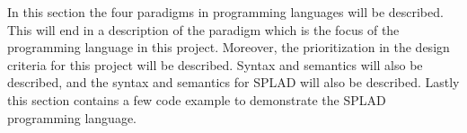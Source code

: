 In this section the four paradigms in programming languages will be described. This will end in a description of the paradigm which is the focus of the programming language in this project. Moreover, the prioritization in the design criteria for this project will be described. Syntax and semantics will also be described, and the syntax and semantics for SPLAD will also be described. Lastly this section contains a few code example to demonstrate the SPLAD programming language. 